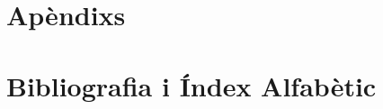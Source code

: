 \documentclass[catalan,a4paper,twoside,11pt]{book}
\begin{document}
   \part{Apèndixs}
      \appendix
      \renewcommand*{\chaptername}{\appendixname}
      
      
      
      
      
      
   \part{Bibliografia i  Índex Alfabètic}
   \backmatter
      
      \printindex
 
\end{document}
